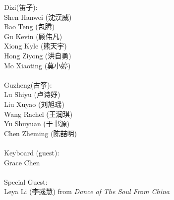\documentclass[letter,6pt,poets]{ConcProg}
\begin{document}
\begin{multicols}{2}
Dizi(笛子): 				 \\    
Shen Hanwei		(沈漢威)     \\
Bao Teng  (包腾)\\
Gu Kevin   (顾伟凡)               \\
Xiong Kyle (熊天宇)\\
Hong Ziyong (洪自勇)\\
Mo Xiaoting (莫小婷)\\
\\
Guzheng({古筝}):\\
Lu Shiyu (卢诗妤)\\
Liu Xuyao  (刘旭瑶)\\               
Wang Rachel (王润琪) \\
Yu Shuyuan   (于书源)\\
Chen Zheming  (陈喆明)\\
\\
Keyboard (guest):\\
Grace Chen
\\
\\
Special Guest:\\
Leya Li (李彧慧)
 \small{ from \emph{ Dance of The Soul From China}}
\\
\end{multicols}
\end{document}
